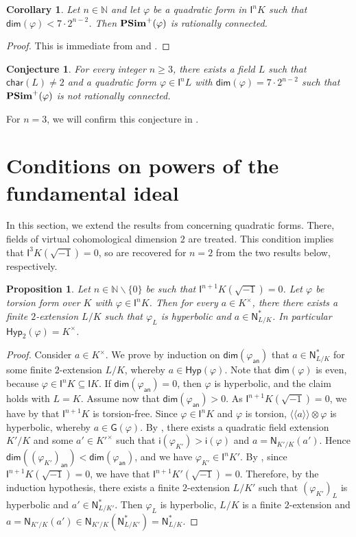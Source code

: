 \documentclass[twoside,11pt]{amsart}
\numberwithin{equation}{section}
\newtheorem{prop}[equation]{Proposition}
\newtheorem{cor}[equation]{Corollary}
\newtheorem{conj}[equation]{Conjecture}
\theoremstyle{definition}
\renewcommand{\dim}{\operatorname{\mathsf{dim}}}
\newcommand\N{\operatorname{N}}
\newcommand{\car}{\mathsf{char}}
\newcommand{\vf}{\varphi}
\newcommand{\mg}[1]{{#1}^{\times}}
\newcommand{\nat}{\mathbb{N}}
\newcommand{\la}{\langle}
\newcommand{\ra}{\rangle}
\newcommand{\lla}{\la\!\la}
\newcommand{\rra}{\ra\!\ra}
\newcommand{\an}{\mathsf{an}}
\renewcommand{\geq}{\geqslant}
\newcommand{\I}{\mathsf{I}}
\renewcommand{\N}{\mathsf{N}}
\newcommand{\G}{\mathsf{G}}
\newcommand{\Hyp}{\mathsf{Hyp}}
\renewcommand{\setminus}{\smallsetminus}
\renewcommand{\dim}{\mathsf{dim}}
\renewcommand{\geq}{\geqslant}
\newcommand{\wi}{\mathsf{i}}
\renewcommand{\setminus}{\smallsetminus}
\begin{document}
\begin{cor}
    Let $n\in\nat$ and let $\varphi$ be a quadratic form in $\I^nK$ such that $\dim(\varphi)<7\cdot 2^{n-2}$. Then
      ${\bf PSim}^+(\varphi)$ is rationally connected.
\end{cor}
\begin{proof}
    This is immediate from  and .
\end{proof}

\begin{conj}
    For every integer $n\geq 3$, there exists a field $L$ such that $\car(L)\neq 2$ and a quadratic form $\varphi\in \I^nL$ with $\dim(\varphi)=7\cdot 2^{n-2}$ such that ${\bf PSim}^+(\varphi)$ is not rationally connected.
\end{conj}

For $n=3$, we will confirm this conjecture in .


\section{Conditions on powers of the fundamental ideal}
\label{S:fui-conditions}

In this section, we extend the results from \cite[Sect.~4]{AP22}  concerning quadratic forms.
There, fields of virtual cohomological dimension $2$ are treated.
This condition implies that $\I^3K(\sqrt{-1})=0$, so \cite[Cor.~4.3 \& Theorem~4.4]{AP22} are recovered for $n=2$ from the two results below, respectively.

\begin{prop}\label{P:virt-In-torsion-split}
    Let $n\in\nat\setminus\{0\}$ be such that $\I^{n+1} K(\sqrt{-1})=0$.
    Let $\varphi$ be torsion form  over $K$ with $\varphi\in \I^nK$.
    Then for every $a\in\mg{K}$, there there exists a finite $2$-extension $L/K$ such that $\varphi_{L}$ is hyperbolic and $a\in\N_{L/K}^\ast$.
    In particular $\Hyp_2(\vf)=\mg{K}$.
\end{prop}
\begin{proof}
Consider $a\in\mg{K}$.
We prove by induction on $\dim(\vf_\an)$ that $a\in\N_{L/K}^\ast$ for some finite $2$-extension $L/K$, whereby $a\in\Hyp(\vf)$.
Note that $\dim(\vf)$ is even, because $\vf\in\I^{n}K\subseteq \I K$.
If $\dim(\vf_\an)=0$, then $\vf$ is hyperbolic, and the claim holds with $L=K$.
Assume now that $\dim(\vf_\an)>0$.
As $\I^{n+1}K(\sqrt{-1})=0$, we have by \cite[Cor.~35.27]{EKM08} that $\I^{n+1}K$ is torsion-free.
Since $\vf\in\I^nK$ and $\vf$ is torsion, $\lla a\rra\otimes \vf$ is hyperbolic, whereby $a\in\G(\vf)$.
By , there exists a quadratic field extension $K'/K$ and some $a'\in\mg{K'}$ such that $\wi(\vf_{K'})>\wi(\vf)$ and $a=\N_{K'/K}(a')$. Hence $\dim((\vf_{K'})_\an)<\dim(\vf_\an)$, and we have $\vf_{K'}\in\I^nK'$.
By \cite[Cor.~35.8]{EKM08}, since $\I^{n+1}K(\sqrt{-1})=0$, we have that $\I^{n+1}K'(\sqrt{-1})=0$.
Therefore, by the induction hypothesis, there exists a finite $2$-extension $L/K'$ such that $(\vf_{K'})_L$ is hyperbolic and $a'\in\N_{L/K'}^\ast$. Then $\vf_L$ is hyperbolic, $L/K$ is a finite $2$-extension and $a=\N_{K'/K}(a')\in\N_{K'/K}(\N_{L/K'}^\ast)=\N_{L/K}^\ast$.
\end{proof}
\end{document}
